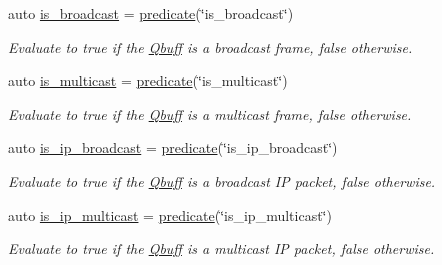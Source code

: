 \begin{DoxyCompactItemize}
\item 
auto \hyperlink{namespacepfq_1_1lang_1_1experimental_1_1anonymous__namespace_02experimental_8hpp_03_aa9e352437ab1621e226173bc1d900b96}{is\+\_\+broadcast} = \hyperlink{namespacepfq_1_1lang_aca9adafc436b7f851621b979fa1aaf88}{predicate}(\char`\"{}is\+\_\+broadcast\char`\"{})
\begin{DoxyCompactList}\small\item\em Evaluate to {\ttfamily true} if the \hyperlink{structpfq_1_1lang_1_1Qbuff}{Qbuff} is a broadcast frame, {\ttfamily false} otherwise. \end{DoxyCompactList}\item 
auto \hyperlink{namespacepfq_1_1lang_1_1experimental_1_1anonymous__namespace_02experimental_8hpp_03_aaec1b91653bd79cedff8912605c7cdf8}{is\+\_\+multicast} = \hyperlink{namespacepfq_1_1lang_aca9adafc436b7f851621b979fa1aaf88}{predicate}(\char`\"{}is\+\_\+multicast\char`\"{})
\begin{DoxyCompactList}\small\item\em Evaluate to {\ttfamily true} if the \hyperlink{structpfq_1_1lang_1_1Qbuff}{Qbuff} is a multicast frame, {\ttfamily false} otherwise. \end{DoxyCompactList}\item 
auto \hyperlink{namespacepfq_1_1lang_1_1experimental_1_1anonymous__namespace_02experimental_8hpp_03_a2d9128841747bf619fdf6ea411ee35e4}{is\+\_\+ip\+\_\+broadcast} = \hyperlink{namespacepfq_1_1lang_aca9adafc436b7f851621b979fa1aaf88}{predicate}(\char`\"{}is\+\_\+ip\+\_\+broadcast\char`\"{})
\begin{DoxyCompactList}\small\item\em Evaluate to {\ttfamily true} if the \hyperlink{structpfq_1_1lang_1_1Qbuff}{Qbuff} is a broadcast IP packet, {\ttfamily false} otherwise. \end{DoxyCompactList}\item 
auto \hyperlink{namespacepfq_1_1lang_1_1experimental_1_1anonymous__namespace_02experimental_8hpp_03_a6b14037fa990cc066d69c9f491345156}{is\+\_\+ip\+\_\+multicast} = \hyperlink{namespacepfq_1_1lang_aca9adafc436b7f851621b979fa1aaf88}{predicate}(\char`\"{}is\+\_\+ip\+\_\+multicast\char`\"{})
\begin{DoxyCompactList}\small\item\em Evaluate to {\ttfamily true} if the \hyperlink{structpfq_1_1lang_1_1Qbuff}{Qbuff} is a multicast IP packet, {\ttfamily false} otherwise. \end{DoxyCompactList}\item 

\end{DoxyCompactItemize}

